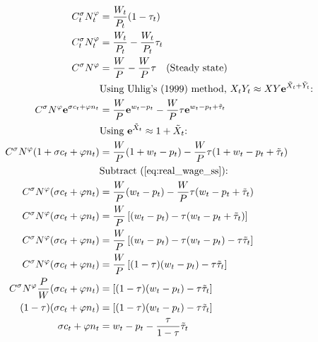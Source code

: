 \begin{align}
    C_t^\sigma N_t^\varphi &= \frac{W_t}{P_t}(1-\tau_t) \\
    C_t^\sigma N_t^\varphi &= \frac{W_t}{P_t} - \frac{W_t}{P_t}\tau_t \\
    C^\sigma N^\varphi &= \frac{W}{P} - \frac{W}{P}\tau \label{eq:real_wage_ss} \quad \text{(Steady state)}\\
    &\text{Using Uhlig's (1999) method, $X_tY_t \approx XY\mathbf{e}^{\tilde{X}_t + \tilde{Y}_t}$: }\\
    C^\sigma N^\varphi\mathbf{e}^{\sigma c_t + \varphi n_t} &= \frac{W}{P}\mathbf{e}^{w_t - p_t} - \frac{W}{P}\tau \mathbf{e}^{w_t - p_t + \tilde{\tau}_t}\\
    &\text{Using $\mathbf{e}^{\tilde{X}_t} \approx 1 + {\tilde{X}_t}$: }\\
    C^\sigma N^\varphi({1+\sigma c_t + \varphi n_t}) &= \frac{W}{P}({1+ w_t - p_t}) - \frac{W}{P}\tau ({1+ w_t - p_t + \tilde{\tau}_t})\\
    &\text{Subtract (\ref{eq:real_wage_ss}): } \\
    C^\sigma N^\varphi({\sigma c_t + \varphi n_t}) &= \frac{W}{P}({w_t - p_t}) - \frac{W}{P}\tau ({w_t - p_t + \tilde{\tau}_t})\\
    C^\sigma N^\varphi({\sigma c_t + \varphi n_t}) &= \frac{W}{P}\left[({w_t - p_t}) - \tau ({w_t - p_t + \tilde{\tau}_t})\right]\\
    C^\sigma N^\varphi({\sigma c_t + \varphi n_t}) &= \frac{W}{P}\left[({w_t - p_t}) - \tau ({w_t - p_t}) - \tau\tilde{\tau}_t\right]\\
    C^\sigma N^\varphi({\sigma c_t + \varphi n_t}) &= \frac{W}{P}\left[(1-\tau)({w_t - p_t}) - \tau\tilde{\tau}_t\right]\\
    C^\sigma N^\varphi \frac{P}{W} ({\sigma c_t + \varphi n_t})  &= \left[(1-\tau)({w_t - p_t}) - \tau\tilde{\tau}_t\right]\\
    (1-\tau)({\sigma c_t + \varphi n_t})  &= \left[(1-\tau)({w_t - p_t}) - \tau\tilde{\tau}_t\right]\\
    {\sigma c_t + \varphi n_t}  &= {w_t - p_t} - \frac{\tau}{1-\tau}\tilde{\tau}_t\\
\end{align}
\pagebreak

